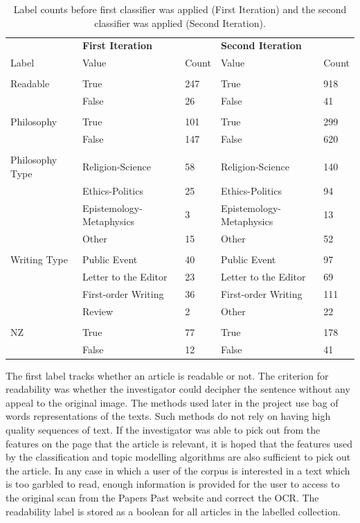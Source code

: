 \documentclass{article}
\begin{document}
\begin{table}[]
        \centering
        \footnotesize
        \begin{tabular}{l|ll|ll}
          & \textbf{First Iteration} & & \textbf{Second Iteration}  & \\
          Label & Value & Count & Value & Count \\
          \hline
          & & & &  \\
        	Readable & True & 247 & True & 918 \\
        	& False & 26 & False & 41 \\
          & & & &  \\
          Philosophy & True & 101 & True & 299 \\
          & False & 147 & False & 620 \\
          & & & &  \\
          Philosophy Type & Religion-Science & 58 & Religion-Science & 140 \\
          & Ethics-Politics & 25 &  Ethics-Politics & 94 \\
          & Epistemology-Metaphysics & 3 & Epistemology-Metaphysics & 13 \\
          & Other & 15 &  Other & 52 \\
          & & & &  \\
          Writing Type & Public Event & 40 & Public Event & 97 \\
          & Letter to the Editor & 23 &  Letter to the Editor & 69 \\
          & First-order Writing & 36 &  First-order Writing & 111 \\
          & Review & 2 &  Other & 22 \\
          & & & &  \\
          NZ & True & 77 & True & 178 \\
          & False & 12 & False & 41 \\
        \end{tabular}
        \caption{Label counts before first classifier was applied (First Iteration) and the second classifier was applied (Second Iteration).}
        \label{t:labels}
\end{table}

The first label tracks whether an article is readable or not. The criterion for readability was whether the investigator could decipher the sentence without any appeal to the original image. The methods used later in the project use bag of words representations of the texts. Such methods do not rely on having high quality sequences of text. If the investigator was able to pick out from the features on the page that the article is relevant, it is hoped that the features used by the classification and topic modelling algorithms are also sufficient to pick out the article. In any case in which a user of the corpus is interested in a text which is too garbled to read, enough information is provided for the user to access to the original scan from the Papers Past website and correct the OCR. The readability label is stored as a boolean for all articles in the labelled collection.
\end{document}
